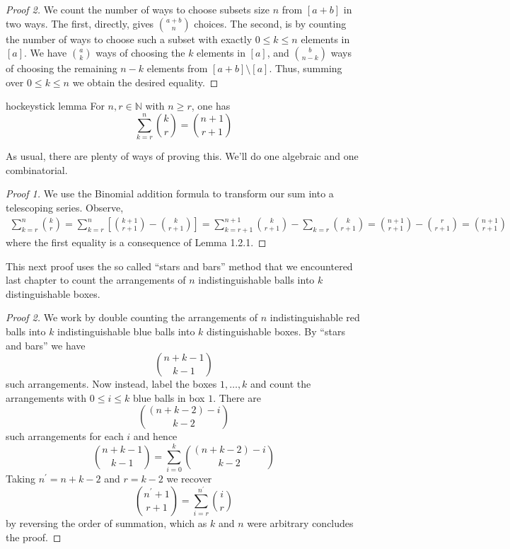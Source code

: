 \documentclass{article}
\begin{document}
\begin{proof}[Proof 2]
    We count the number of ways to choose subsets size $n$ from $[a+b]$ in two ways. The first, directly, gives 
    $\binom{a+b}{n}$ choices. The second, is by counting the number of ways to choose such a subset with exactly 
    $0 \leq k \leq n$ elements in $[a]$. We have $\binom{a}{k}$ ways of choosing the $k$ elements in $[a]$, and 
    $\binom{b}{n-k}$ ways of choosing the remaining $n-k$ elements from $[a+b] \setminus [a]$. Thus, summing over 
    $0 \leq k \leq n$ we obtain the desired equality.
\end{proof}

\begin{proposition}[]{hockeystick lemma}
    For $n, r \in \mathbb{N}$ with $n \geq r$, one has \[\sum_{k=r}^n \binom{k}{r} = \binom{n+1}{r+1}\]
\end{proposition}

As usual, there are plenty of ways of proving this. We'll do one algebraic and one combinatorial. 

\begin{proof}[Proof 1]
    We use the Binomial addition formula to transform our sum into a telescoping series. Observe, 
    \begin{align*}
        \sum_{k = r}^n \binom{k}{r} = \sum_{k=r}^n \left[\binom{k+1}{r+1} - \binom{k}{r+1}\right] 
        = \sum_{k = r+1}^{n+1}\binom{k}{r+1} - \sum_{k = r}\binom{k}{r+1} = \binom{n+1}{r+1} - \binom{r}{r+1} 
        = \binom{n+1}{r+1}
    \end{align*}
    where the first equality is a consequence of Lemma 1.2.1. 
\end{proof}

This next proof uses the so called ``stars and bars'' method that we encountered last chapter to count the 
arrangements of $n$ indistinguishable balls into $k$ distinguishable boxes. 

\begin{proof}[Proof 2]
    We work by double counting the arrangements of $n$ indistinguishable red balls into $k$ 
    indistinguishable blue balls into $k$ distinguishable boxes. By ``stars and bars'' we have 
    \[\binom{n+k-1}{k-1}\]
    such arrangements. Now instead, label the boxes $1, \dots, k$ and count the arrangements with $0 \leq i \leq k$ 
    blue balls in box $1$. There are 
    \[\binom{(n+k-2) - i}{k-2}\]
    such arrangements for each $i$ and hence 
    \[\binom{n+k-1}{k-1} = \sum_{i = 0}^k \binom{(n+k-2) - i}{k-2}\]
    Taking $n^\prime = n + k - 2$ and $r = k-2$ we recover 
    \[\binom{n^\prime+1}{r + 1} = \sum_{i=r}^{n^\prime}\binom{i}{r}\]
    by reversing the order of summation, which as $k$ and $n$ were arbitrary concludes the proof.
\end{proof}
\end{document}
